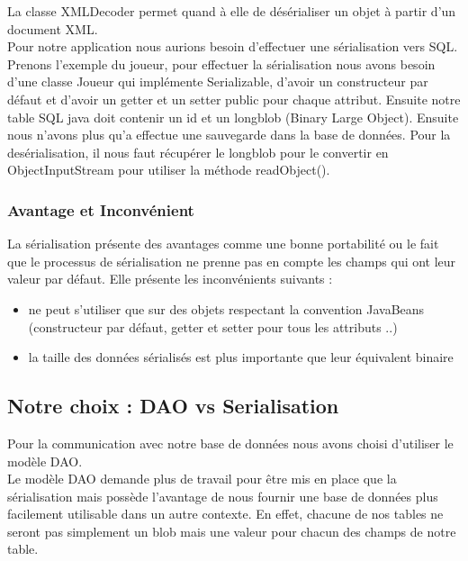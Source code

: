 La classe XMLDecoder permet quand à elle de désérialiser un objet à partir d'un document XML. \\

Pour notre application nous aurions besoin d'effectuer une sérialisation vers SQL. Prenons l'exemple du joueur, pour effectuer la sérialisation nous avons besoin d'une classe Joueur qui implémente Serializable, d'avoir un constructeur par défaut et d'avoir un getter et un setter public pour chaque attribut. Ensuite notre table SQL java doit contenir un id et un longblob (Binary Large Object). Ensuite nous n'avons plus qu'a effectue une sauvegarde dans la base de données. Pour la desérialisation, il nous faut récupérer le longblob pour le convertir en ObjectInputStream pour utiliser la méthode readObject(). 


\subsubsection{Avantage et Inconvénient}
La sérialisation présente des avantages comme une bonne portabilité ou le fait que le processus de sérialisation ne prenne pas en compte les champs qui ont leur valeur par défaut. Elle présente les inconvénients suivants : 
\begin{itemize}
\item ne peut s'utiliser que sur des objets respectant la convention JavaBeans (constructeur par défaut, getter et setter pour tous les attributs ..)
\item la taille des données sérialisés est plus importante que leur équivalent binaire
\end{itemize}


\subsection{Notre choix : DAO vs Serialisation}
Pour la communication avec notre base de données nous avons choisi d'utiliser le modèle DAO. \\

Le modèle DAO demande plus de travail pour être mis en place que la sérialisation mais possède l'avantage de nous fournir une base de données plus facilement utilisable dans un autre contexte. En effet, chacune de nos tables ne seront pas simplement un blob mais une valeur pour chacun des champs de notre table. 